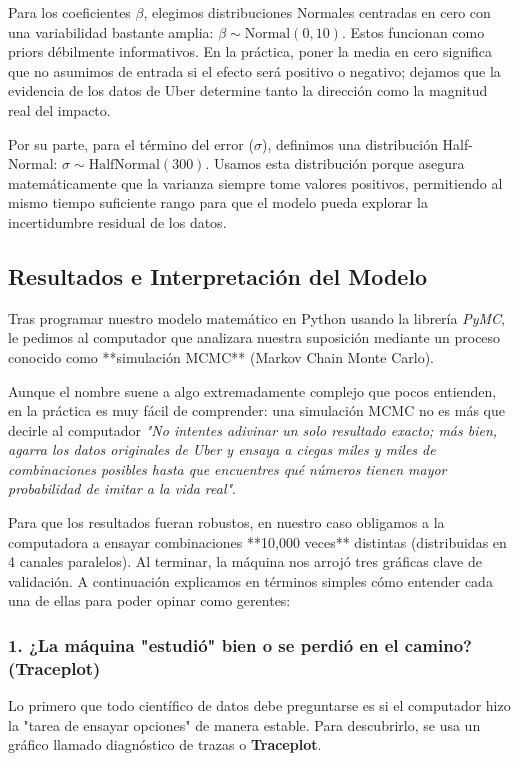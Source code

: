 \documentclass[11pt,a4paper]{article}
\begin{document}
Para los coeficientes $\beta$, elegimos distribuciones Normales centradas en cero con una variabilidad bastante amplia: $\beta \sim \text{Normal}(0, 10)$. Estos funcionan como priors débilmente informativos. En la práctica, poner la media en cero significa que no asumimos de entrada si el efecto será positivo o negativo; dejamos que la evidencia de los datos de Uber determine tanto la dirección como la magnitud real del impacto.

Por su parte, para el término del error ($\sigma$), definimos una distribución Half-Normal: $\sigma \sim \text{HalfNormal}(300)$. Usamos esta distribución porque asegura matemáticamente que la varianza siempre tome valores positivos, permitiendo al mismo tiempo suficiente rango para que el modelo pueda explorar la incertidumbre residual de los datos.

\subsection{Resultados e Interpretación del Modelo}
\label{sec:resultados_uber}

Tras programar nuestro modelo matemático en Python usando la librería \textit{PyMC}, le pedimos al computador que analizara nuestra suposición mediante un proceso conocido como **simulación MCMC** (Markov Chain Monte Carlo). 

Aunque el nombre suene a algo extremadamente complejo que pocos entienden, en la práctica es muy fácil de comprender: una simulación MCMC no es más que decirle al computador \textit{"No intentes adivinar un solo resultado exacto; más bien, agarra los datos originales de Uber y ensaya a ciegas miles y miles de combinaciones posibles hasta que encuentres qué números tienen mayor probabilidad de imitar a la vida real"}. 

Para que los resultados fueran robustos, en nuestro caso obligamos a la computadora a ensayar combinaciones **10,000 veces** distintas (distribuidas en 4 canales paralelos). Al terminar, la máquina nos arrojó tres gráficas clave de validación. A continuación explicamos en términos simples cómo entender cada una de ellas para poder opinar como gerentes:

\subsubsection*{1. ¿La máquina "estudió" bien o se perdió en el camino? (Traceplot)}

Lo primero que todo científico de datos debe preguntarse es si el computador hizo la "tarea de ensayar opciones" de manera estable. Para descubrirlo, se usa un gráfico llamado diagnóstico de trazas o \textbf{Traceplot}.
\end{document}

